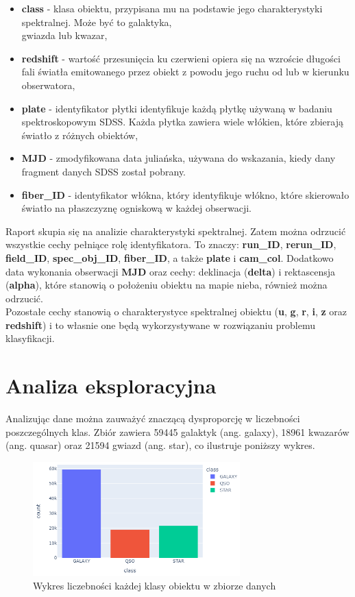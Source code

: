 \documentclass[conference]{IEEEtran}
\begin{document}
\begin{itemize}
    \item \textbf{class} - klasa obiektu, przypisana mu na podstawie jego charakterystyki spektralnej. Może być to galaktyka,\\ gwiazda lub kwazar,
    \item \textbf{redshift} - wartość przesunięcia ku czerwieni opiera się na wzroście długości fali światła emitowanego przez obiekt z powodu jego ruchu od lub w kierunku obserwatora,
    \item \textbf{plate} - identyfikator płytki identyfikuje każdą płytkę używaną w badaniu spektroskopowym SDSS. Każda płytka zawiera wiele włókien, które zbierają światło z różnych obiektów,
    \item \textbf{MJD} - zmodyfikowana data juliańska, używana do wskazania, kiedy dany fragment danych SDSS został pobrany.
    \item \textbf{fiber\_ID} - identyfikator włókna, który identyfikuje włókno, które skierowało światło na płaszczyznę ogniskową w każdej obserwacji.
\end{itemize}

Raport skupia się na analizie charakterystyki spektralnej. Zatem można odrzucić wszystkie cechy pełniące rolę identyfikatora. To znaczy: \textbf{run\_ID}, \textbf{rerun\_ID}, \textbf{field\_ID}, \textbf{spec\_obj\_ID}, \textbf{fiber\_ID}, a także \textbf{plate} i \textbf{cam\_col}. Dodatkowo data wykonania obserwacji \textbf{MJD} oraz cechy: deklinacja (\textbf{delta}) i rektascensja (\textbf{alpha}), które stanowią o położeniu obiektu na mapie nieba, również można odrzucić. \\
Pozostałe cechy stanowią o charakterystyce spektralnej obiektu (\textbf{u}, \textbf{g}, \textbf{r}, \textbf{i}, \textbf{z} oraz \textbf{redshift}) i to własnie one będą wykorzystywane w rozwiązaniu problemu klasyfikacji.
\section{Analiza eksploracyjna}
Analizując dane można zauważyć znaczącą dysproporcję w liczebności poszczególnych klas. Zbiór zawiera 59445 galaktyk (ang. galaxy), 18961 kwazarów (ang. quasar) oraz 21594 gwiazd (ang. star), co ilustruje poniższy wykres. 
\begin{figure}[ht]
        \centering
        \includegraphics[width = 8cm]{figures/class_count.png}
        \caption{Wykres liczebności każdej klasy obiektu w zbiorze danych}
\end{figure} \\
\end{document}
